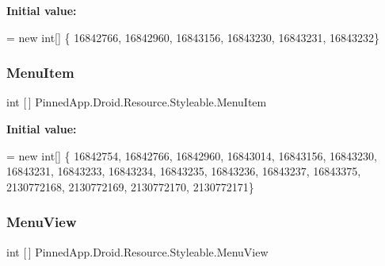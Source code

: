 {\bfseries Initial value\+:}
\begin{DoxyCode}
= \textcolor{keyword}{new} \textcolor{keywordtype}{int}[] \{
                    16842766,
                    16842960,
                    16843156,
                    16843230,
                    16843231,
                    16843232\}
\end{DoxyCode}
\mbox{\label{class_pinned_app_1_1_droid_1_1_resource_1_1_styleable_a47cc7691a0575f336103a4ff7f71c209}} 
\subsubsection{\texorpdfstring{Menu\+Item}{MenuItem}}
{\footnotesize\ttfamily int \mbox{[}$\,$\mbox{]} Pinned\+App.\+Droid.\+Resource.\+Styleable.\+Menu\+Item\hspace{0.3cm}{\ttfamily [static]}}

{\bfseries Initial value\+:}
\begin{DoxyCode}
= \textcolor{keyword}{new} \textcolor{keywordtype}{int}[] \{
                    16842754,
                    16842766,
                    16842960,
                    16843014,
                    16843156,
                    16843230,
                    16843231,
                    16843233,
                    16843234,
                    16843235,
                    16843236,
                    16843237,
                    16843375,
                    2130772168,
                    2130772169,
                    2130772170,
                    2130772171\}
\end{DoxyCode}
\mbox{\label{class_pinned_app_1_1_droid_1_1_resource_1_1_styleable_a4a67da8fa6d22a38a41b9bbb7c083913}} 
\subsubsection{\texorpdfstring{Menu\+View}{MenuView}}
{\footnotesize\ttfamily int \mbox{[}$\,$\mbox{]} Pinned\+App.\+Droid.\+Resource.\+Styleable.\+Menu\+View\hspace{0.3cm}{\ttfamily [static]}}

